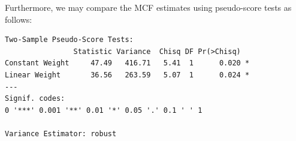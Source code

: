 Furthermore, we may compare the MCF estimates using pseudo-score tests
\citep{cook1996biometrics} as follows:

\begin{Shaded}
\begin{Highlighting}[]
\end{Highlighting}
\end{Shaded}

\begin{verbatim}
Two-Sample Pseudo-Score Tests:
                Statistic Variance  Chisq DF Pr(>Chisq)  
Constant Weight     47.49   416.71   5.41  1      0.020 *
Linear Weight       36.56   263.59   5.07  1      0.024 *
---
Signif. codes:  
0 '***' 0.001 '**' 0.01 '*' 0.05 '.' 0.1 ' ' 1

Variance Estimator: robust 
\end{verbatim}
